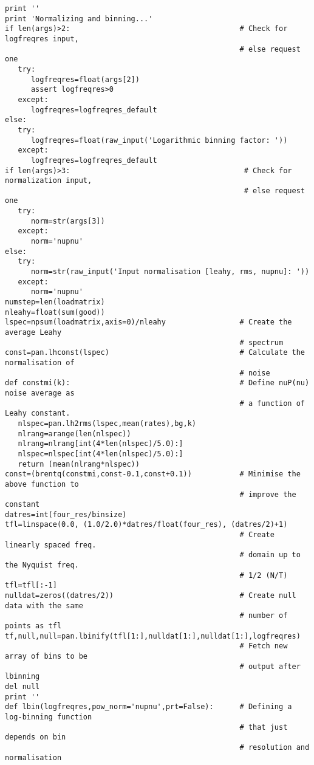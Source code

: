 \begin{verbatim}
print ''
print 'Normalizing and binning...'
if len(args)>2:                                       # Check for logfreqres input,
                                                      # else request one
   try:
      logfreqres=float(args[2])
      assert logfreqres>0
   except:
      logfreqres=logfreqres_default
else:
   try:
      logfreqres=float(raw_input('Logarithmic binning factor: '))
   except:
      logfreqres=logfreqres_default
if len(args)>3:                                        # Check for normalization input,
                                                       # else request one
   try:
      norm=str(args[3])
   except:
      norm='nupnu'
else:
   try:
      norm=str(raw_input('Input normalisation [leahy, rms, nupnu]: '))
   except:
      norm='nupnu'
numstep=len(loadmatrix)
nleahy=float(sum(good))
lspec=npsum(loadmatrix,axis=0)/nleahy                 # Create the average Leahy
                                                      # spectrum
const=pan.lhconst(lspec)                              # Calculate the normalisation of
                                                      # noise
def constmi(k):                                       # Define nuP(nu) noise average as
                                                      # a function of  Leahy constant.
   nlspec=pan.lh2rms(lspec,mean(rates),bg,k)
   nlrang=arange(len(nlspec))
   nlrang=nlrang[int(4*len(nlspec)/5.0):]
   nlspec=nlspec[int(4*len(nlspec)/5.0):]
   return (mean(nlrang*nlspec))
const=(brentq(constmi,const-0.1,const+0.1))           # Minimise the above function to
                                                      # improve the constant
datres=int(four_res/binsize)
tfl=linspace(0.0, (1.0/2.0)*datres/float(four_res), (datres/2)+1)
                                                      # Create linearly spaced freq.
                                                      # domain up to the Nyquist freq.
                                                      # 1/2 (N/T)
tfl=tfl[:-1]
nulldat=zeros((datres/2))                             # Create null data with the same
                                                      # number of points as tfl
tf,null,null=pan.lbinify(tfl[1:],nulldat[1:],nulldat[1:],logfreqres)
                                                      # Fetch new array of bins to be
                                                      # output after lbinning
del null
print ''
def lbin(logfreqres,pow_norm='nupnu',prt=False):      # Defining a log-binning function
                                                      # that just depends on bin
                                                      # resolution and normalisation

\end{verbatim}
